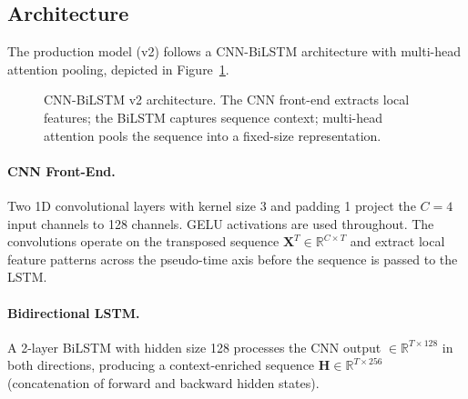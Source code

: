 \documentclass[12pt]{article}
\theoremstyle{plain}
\begin{document}
\subsection{Architecture}

The production model (v2) follows a CNN-BiLSTM architecture with multi-head attention pooling, depicted in Figure~\ref{fig:model_arch}.

\begin{figure}[H]
\centering
{}
\caption{CNN-BiLSTM v2 architecture. The CNN front-end extracts local features; the BiLSTM captures sequence context; multi-head attention pools the sequence into a fixed-size representation.}
\label{fig:model_arch}
\end{figure}

\paragraph{CNN Front-End.}
Two 1D convolutional layers with kernel size 3 and padding 1 project the $C{=}4$ input channels to 128 channels. GELU activations are used throughout. The convolutions operate on the transposed sequence $\mathbf{X}^T \in \mathbb{R}^{C \times T}$ and extract local feature patterns across the pseudo-time axis before the sequence is passed to the LSTM.

\paragraph{Bidirectional LSTM.}
A 2-layer BiLSTM with hidden size 128 processes the CNN output $\in \mathbb{R}^{T \times 128}$ in both directions, producing a context-enriched sequence $\mathbf{H} \in \mathbb{R}^{T \times 256}$ (concatenation of forward and backward hidden states).
\end{document}
